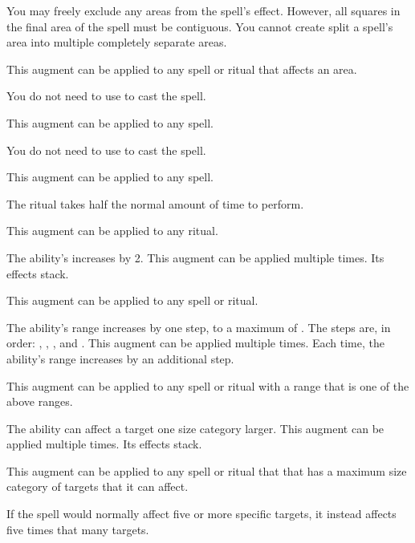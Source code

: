              You may freely exclude any areas from the spell's effect.
            However, all squares in the final area of the spell must be contiguous.
            You cannot create split a spell's area into multiple completely separate areas.
            \par This augment can be applied to any spell or ritual that affects an area.

             You do not need to use  to cast the spell.
            \par This augment can be applied to any spell.

             You do not need to use  to cast the spell.
            \par This augment can be applied to any spell.

             The ritual takes half the normal amount of time to perform.
            \par This augment can be applied to any ritual.

             The ability's  increases by 2.
            This augment can be applied multiple times.
            Its effects stack.
            \par This augment can be applied to any spell or ritual.

             The ability's range increases by one step, to a maximum of \rngext.
            The steps are, in order: \rngclose, \rngmed, \rnglong, and \rngext.
            This augment can be applied multiple times.
            Each time, the ability's range increases by an additional step.
            \par This augment can be applied to any spell or ritual with a range that is one of the above ranges.

             The ability can affect a target one size category larger.
            This augment can be applied multiple times.
            Its effects stack.
            \par This augment can be applied to any spell or ritual that that has a maximum size category of targets that it can affect.

             If the spell would normally affect five or more specific targets, it instead affects five times that many targets.

